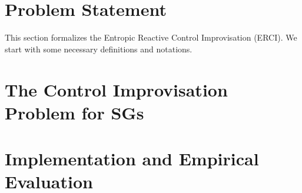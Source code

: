 \documentclass[conference]{IEEEtran}
\theoremstyle{remark}
\newcommand{\sg}{\mathcal{G}}
\newcommand{\eventually}[1]{\lozenge^{\leq #1}}
\newcommand{\sched}{\sigma}
\begin{document}

\section{Problem Statement}
\label{sec:problem}
This section formalizes the Entropic Reactive Control Improvisation (ERCI).  We start with some necessary definitions and notations.








 
\section{The Control Improvisation Problem for SGs}\label{sec:sgs}

%


\section{Implementation and Empirical Evaluation}
\label{sec:empirical}




\end{document}
